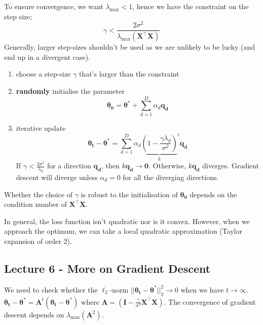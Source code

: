 \documentclass[a4paper, 12pt]{article}
\newcommand{\summation}[2]{\sum\limits_{#1}^{#2}}
\newcommand{\mat}[1]{\boldsymbol{#1}}
\renewcommand{\vec}[1]{\boldsymbol{#1}}
\begin{document}
            To ensure convergence, we want $\lambda_\text{max} < 1$, hence we have the constraint on the step size;
            $$\gamma < \frac{2 \sigma^2}{\lambda_\text{max}(\mat{X}^\top\mat{X})}$$
            Generally, larger step-sizes shouldn't be used as we are unlikely to be lucky (and end up in a divergent case).
            \begin{enumerate}[1.]
                \itemsep0em
                \item choose a step-size $\gamma$ that's larger than the constraint
                \item \textbf{randomly} initialise the parameter
                    $$\vec{\theta_0} = \vec{\theta^*} + \summation{d = 1}{D} \alpha_d \vec{q_d}$$
                \item iterative update
                    $$\vec{\theta_t} - \vec{\theta^*} = \summation{d = 1}{D} \alpha_d {\underbrace{(1 - \frac{\gamma \lambda_d}{\sigma^2})}_k}^t\vec{q_d}$$
                    If $\gamma < \frac{2\sigma^2}{\lambda_d}$ for a direction $\vec{q_d}$, then $k\vec{q_d} \to \vec{0}$.
                    Otherwise, $k\vec{q_d}$ diverges.
                    Gradient descent will diverge unless $\alpha_d = 0$ for all the diverging directions.
            \end{enumerate}
            Whether the choice of $\gamma$ is robust to the initialisation of $\vec{\theta_0}$ depends on the condition number of $\mat{X}^\top\mat{X}$.
            \medskip

            In general, the loss function isn't quadratic nor is it convex.
            However, when we approach the optimum, we can take a local quadratic approximation (Taylor expansion of order 2).
        \subsection*{Lecture 6 - More on Gradient Descent}
            We need to check whether the $\ell_2$-norm $|| \mat{\theta_t} - \mat{\theta^*} ||_2^2 \to 0$ when we have $t \to \infty$.
            $\mat{\theta_t} - \mat{\theta^*} = \mat{A}^t(\mat{\theta_t} - \mat{\theta^*})$ where $\mat{A} = (\mat{I} - \frac{\gamma}{\sigma^2} \mat{X}^\top\mat{X})$.
            The convergence of gradient descent depends on $\lambda_\text{max}(\mat{A}^2)$.
            \medskip
\end{document}
